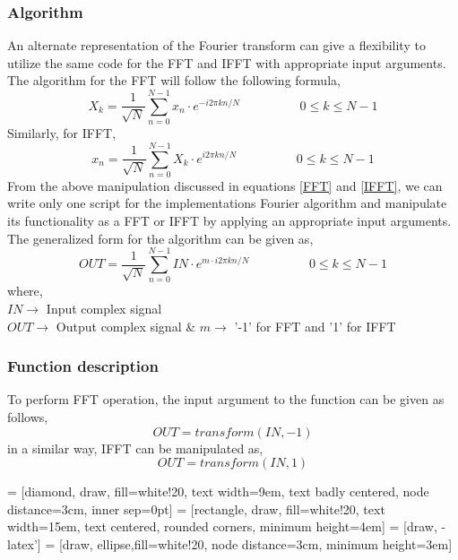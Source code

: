 \subsubsection{Algorithm}
An alternate representation of the Fourier transform can give a flexibility to utilize the same code for the FFT and IFFT with appropriate input arguments. The algorithm for the FFT will follow the following formula,
\begin{equation}
X_k =\frac{1}{\sqrt{N}} \sum\limits_{n=0}^{N-1} x_n \cdot e^{-i2\pi kn/N}		\hspace{2cm}	0\leq k \leq N-1 
\label{FFT}
\end{equation}
Similarly, for IFFT,
\begin{equation}
x_n =\frac{1}{\sqrt{N}} \sum\limits_{n=0}^{N-1} X_k \cdot e^{i2\pi kn/N}		\hspace{2cm}	0\leq k \leq N-1 
\label{IFFT}
\end{equation}
From the above manipulation discussed in equations \ref{FFT} and \ref{IFFT}, we can write only one script for the implementations Fourier algorithm and manipulate its functionality as a FFT or IFFT by applying an appropriate input arguments. \\
The generalized form for the algorithm can be given as,
\begin{equation}
OUT =\frac{1}{\sqrt{N}} \sum\limits_{n=0}^{N-1} IN \cdot e^{m \cdot i2\pi kn/N}		\hspace{2cm}	0\leq k \leq N-1 
\label{FT}
\end{equation}
where,\\
$IN \rightarrow$ {Input complex signal}\\
$OUT \rightarrow$ {Output complex signal} \& $m \rightarrow$ {'-1' for FFT and '1' for IFFT}\\

\subsubsection{Function description}
To perform FFT operation, the input argument to the function can be given as follows,
\begin{equation*}
OUT = transform(IN,-1)
\end{equation*}
in a similar way, IFFT can be manipulated as,
\begin{equation*}
OUT = transform(IN,1)
\end{equation*}

\newpage
 = [diamond, draw, fill=white!20, 
text width=9em, text badly centered, node distance=3cm, inner sep=0pt]
 = [rectangle, draw, fill=white!20, 
text width=15em, text centered, rounded corners, minimum height=4em]
 = [draw, -latex']
 = [draw, ellipse,fill=white!20, node distance=3cm,
minimum height=3em]

